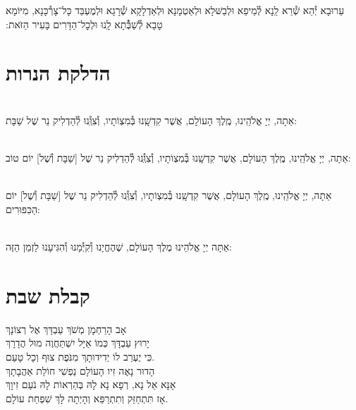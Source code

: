 \documentclass[twoside, openany, parskip=half, 11pt]{book}
\begin{document}
עֵרוּבָא יְ֯הֵא שְׁ֯רֵא לַֽנָא לְ֯מֵיפֵא וּלְבַשּּׁלָא וּלְאַטְמָנָא וּלְאַדְלָקָא שְׁ֯רָגָא וּלְמֶעְבַּד כָּל־צָרְ֯כָּנָא, מִיּוֹמָא טָבָא לְ֯שַׁבְּ֯֯תָא לָֽנוּ וּלְכׇל־הַדָּרִים בָּעִיר הַזּׂאת:‏


\vspace{\baselineskip}
{\let\clearpage\relax
\chapter[הדלקת הנרות שבת ויום טוב]{ הדלקת הנרות }}

\\
אַתָה, יְיָ אֱלֹהֵֽינוּ, מֶֽלֶךְ הָעוֹלָם, אֲשֶׁר קִדְשָֽׁנוּ בְּ֯מִצְוֹתָיו, וְ֯צִוְּֽ֯נוּ לְ֯הַדְלִיק נֵר שֶׁל שַׁבָּת:

\\
אַתָה, יְיָ אֱלֹהֵֽינוּ, מֶֽלֶךְ הָעוֹלָם, אֲשֶׁר קִדְשָֽׁנוּ בְּ֯מִצְוֹתָיו, וְ֯צִוְּֽ֯נוּ לְ֯הַדְלִיק נֵר שֶׁל
[שַׁבָּת וְ֯שֶׁל] יוֹם טוֹב:

\\
אַתָה, יְיָ אֱלֹהֵֽינוּ, מֶֽלֶךְ הָעוֹלָם, אֲשֶׁר קִדְשָֽׁנוּ בְּ֯מִצְוֹתָיו, וְ֯צִוְּֽ֯נוּ לְ֯הַדְלִיק נֵר שֶׁל
[שַׁבָּת וְ֯שֶׁל] יוֹם הַכִּפּוּרִים:

\\
אַתָּה יְיָ אֱלֹהֵינוּ מֶלֶךְ הָעוֹלָם, שֶׁהֶחֱיָנוּ וְ֯קִיְּ֯מָנוּ וְ֯הִגִּיעָנוּ לַזְמַן הַזֶּה:



\chapter[קבלת שבת]{ קבלת שבת }
\label{kabalas_shabbos}

אָב הָרַחְמָן מְשֹׁךְ עַבְדָּךְ אֶל רְצוֹנָךְ\\
יָרוּץ עַבְדָּךְ כְּמוֹ אַיָּל יִשְׁתַּחֲוֶה מוּל הֲדָרָךְ\\
כִּי יֶעְרַב לוֹ יְדִידוּתָךְ מִנֹּפֶת צוּף וְכָל טָעַם.\\


הָדוּר נָאֶה זִיו הָעוֹלָם נַפְשִׁי חוֹלַת אַהֲבָתָךְ\\
אָנָּא אֵל נָא, רְפָא נָא לָהּ בְּהַרְאוֹת לָהּ נֹעַם זִיוָךְ\\
אָז תִּתְחַזֵּק וְתִתְרַפֵּא וְהָיְתָה לָּךְ שִׁפְחַת עוֹלָם.\\
\end{document}
